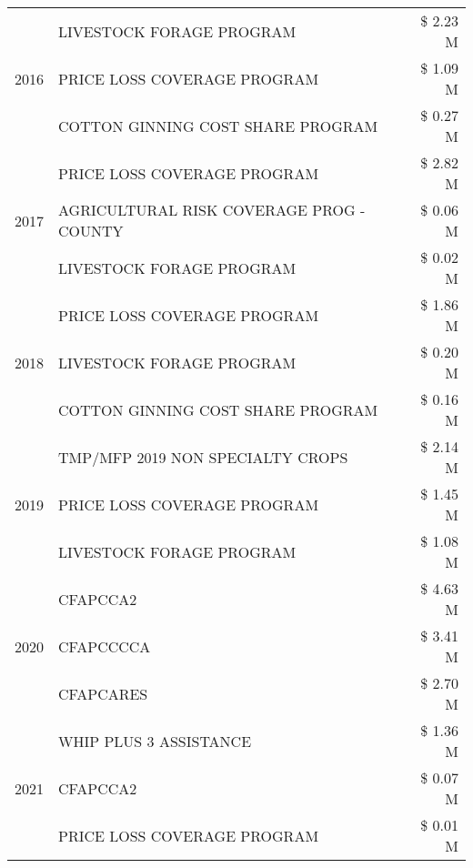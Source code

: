 \begin{tabular}{llr}
\cline{1-3}
\multirow[t]{3}{*}{2016} & LIVESTOCK FORAGE PROGRAM & \$ 2.23 M \\
 & PRICE LOSS COVERAGE PROGRAM & \$ 1.09 M \\
 & COTTON GINNING COST SHARE PROGRAM & \$ 0.27 M \\
\cline{1-3}
\multirow[t]{3}{*}{2017} & PRICE LOSS COVERAGE PROGRAM & \$ 2.82 M \\
 & AGRICULTURAL RISK COVERAGE PROG - COUNTY & \$ 0.06 M \\
 & LIVESTOCK FORAGE PROGRAM & \$ 0.02 M \\
\cline{1-3}
\multirow[t]{3}{*}{2018} & PRICE LOSS COVERAGE PROGRAM & \$ 1.86 M \\
 & LIVESTOCK FORAGE PROGRAM & \$ 0.20 M \\
 & COTTON GINNING COST SHARE PROGRAM & \$ 0.16 M \\
\cline{1-3}
\multirow[t]{3}{*}{2019} & TMP/MFP 2019 NON SPECIALTY CROPS & \$ 2.14 M \\
 & PRICE LOSS COVERAGE PROGRAM & \$ 1.45 M \\
 & LIVESTOCK FORAGE PROGRAM & \$ 1.08 M \\
\cline{1-3}
\multirow[t]{3}{*}{2020} & CFAPCCA2 & \$ 4.63 M \\
 & CFAPCCCCA & \$ 3.41 M \\
 & CFAPCARES & \$ 2.70 M \\
\cline{1-3}
\multirow[t]{3}{*}{2021} & WHIP PLUS 3 ASSISTANCE & \$ 1.36 M \\
 & CFAPCCA2 & \$ 0.07 M \\
 & PRICE LOSS COVERAGE PROGRAM & \$ 0.01 M \\
\cline{1-3}
\bottomrule
\end{tabular}
